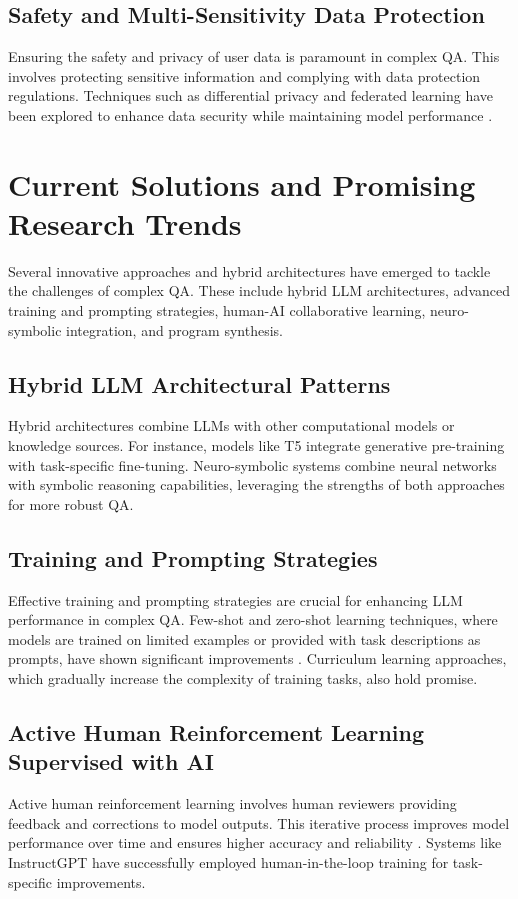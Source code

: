\documentclass{article}
\begin{document}
\subsection{Safety and Multi-Sensitivity Data Protection}
Ensuring the safety and privacy of user data is paramount in complex QA. This involves protecting sensitive information and complying with data protection regulations. Techniques such as differential privacy and federated learning have been explored to enhance data security while maintaining model performance \cite{dwork2008differential}.

\section{Current Solutions and Promising Research Trends}
Several innovative approaches and hybrid architectures have emerged to tackle the challenges of complex QA. These include hybrid LLM architectures, advanced training and prompting strategies, human-AI collaborative learning, neuro-symbolic integration, and program synthesis.

\subsection{Hybrid LLM Architectural Patterns}
Hybrid architectures combine LLMs with other computational models or knowledge sources. For instance, models like T5 \cite{raffel2020exploring} integrate generative pre-training with task-specific fine-tuning. Neuro-symbolic systems combine neural networks with symbolic reasoning capabilities, leveraging the strengths of both approaches for more robust QA.

\subsection{Training and Prompting Strategies}
Effective training and prompting strategies are crucial for enhancing LLM performance in complex QA. Few-shot and zero-shot learning techniques, where models are trained on limited examples or provided with task descriptions as prompts, have shown significant improvements \cite{brown2020language}. Curriculum learning approaches, which gradually increase the complexity of training tasks, also hold promise.

\subsection{Active Human Reinforcement Learning Supervised with AI}
Active human reinforcement learning involves human reviewers providing feedback and corrections to model outputs. This iterative process improves model performance over time and ensures higher accuracy and reliability \cite{bostrom2018superintelligence}. Systems like InstructGPT have successfully employed human-in-the-loop training for task-specific improvements.
\end{document}
